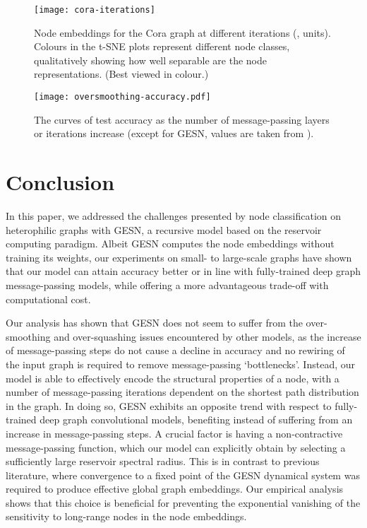 \documentclass[final,5p,times,twocolumn]{elsarticle}
\begin{document}
\begin{figure*}
	\centering
	\texttt{[image: cora-iterations]}
	\caption{Node embeddings for the Cora graph at different iterations  (,  units). Colours in the t-SNE plots represent different node classes, qualitatively showing how well separable are the node representations. (Best viewed in colour.)}
	\label{fig:cora-iterations}
\end{figure*}


\begin{figure*}
	\centering
	\texttt{[image: oversmoothing-accuracy.pdf]}
	\caption{The curves of test accuracy as the number of message-passing layers or iterations increase (except for GESN, values are taken from \cite{Yan2022}).}
	\label{fig:oversmoothing-accuracy}
\end{figure*}


\section{Conclusion}
\label{sec:conclusion}

In this paper, we addressed the challenges presented by node classification on heterophilic graphs with GESN, a recursive model based on the reservoir computing paradigm.
Albeit GESN computes the node embeddings without training its weights, our experiments on small- to large-scale graphs have shown that our model can attain accuracy better or in line with fully-trained deep graph message-passing models, while offering a more advantageous trade-off with computational cost.

Our analysis has shown that GESN does not seem to suffer from the over-smoothing and over-squashing issues encountered by other models, as the increase of message-passing steps do not cause a decline in accuracy and no rewiring of the input graph is required to remove message-passing `bottlenecks'.
Instead, our model is able to effectively encode the structural properties of a node, with a number of message-passing iterations dependent on the shortest path distribution in the graph.
In doing so, GESN exhibits an opposite trend with respect to fully-trained deep graph convolutional models, benefiting instead of suffering from an increase in message-passing steps.
A crucial factor is having a non-contractive message-passing function, which our model can explicitly obtain by selecting a sufficiently large reservoir spectral radius.
This is in contrast to previous literature, where convergence to a fixed point of the GESN dynamical system was required to produce effective global graph embeddings.
Our empirical analysis shows that this choice is beneficial for preventing the exponential vanishing of the sensitivity to long-range nodes in the node embeddings.
\end{document}

